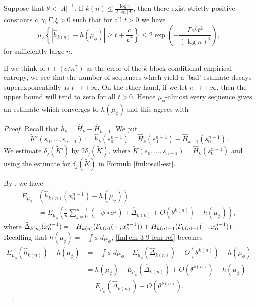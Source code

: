 \begin{theorem} \label{thm:cm-4-2}
	Suppose that $\theta < |A|^{-1}$. If $k(n) \leq \frac{\log{n}}{2\log{|A|}}$, then there exist strictly positive constants $c, \gamma, \Gamma, \xi > 0$ such that for all $t > 0$ we have
	\begin{equation}
		\mu_\phi\left\{\left|\hat{h}_{k(n)} - h(\mu_\phi)\right| \geq t + \frac{c}{n^\gamma}\right\} \leq 2\exp\left(-\frac{\Gamma n^\xi t^2}{(\log{n})^4}\right),
	\end{equation}
	for sufficiently large $n$.
	
	If we think of $t + (c / n^\gamma)$ as the error of the $k$-block conditional empirical entropy, we see that the number of sequences which yield a `bad' estimate decays superexponentially as $t \to +\infty$. On the other hand, if we let $n \to +\infty$, then the upper bound will tend to zero for all $t > 0$. Hence $\mu_\phi$-almost every sequence gives an estimate which converges to $h(\mu_\phi)$ and this agrees with 
	
	\begin{proof}
		Recall that $\hat{h}_k = \hat{H}_k - \hat{H}_{k - 1}$. We put
		\[
			\tilde{K}'(s_0, \dots, s_{n - 1}) := \hat{h}_k(s_0^{n - 1}) = \hat{H}_k(s_0^{n - 1}) - \hat{H}_{k - 1}(s_0^{n - 1}).
		\]
		We estimate $\delta_j(\tilde{K}')$ by $2\delta_j(\tilde{K})$, where $\tilde{K}(s_0, \dots, s_{n - 1}) = \hat{H}_k(s_0^{n - 1})$ and using the estimate for $\delta_j(\tilde{K})$ in Formula \eqref{fml:oscil-est}.
		
		By , we have
		\begin{align}
			E_{\mu_\phi}&\left(\hat{h}_{k(n)}(x_0^{n - 1}) - h(\mu_\phi)\right) \nonumber \\
				&= E_{\mu_\phi}\left(\frac{1}{n}\sum_{j = 0}^{n - 1}(-\phi \circ \sigma^j) + \hat{\Delta}_{k(n)} + O(\theta^{k(n)}) - h(\mu_\phi)\right), \label{fml:cm-3-9-lem-ref}
		\end{align}
		where $\hat{\Delta}_{k(n)}(x_0^{n - 1}) = -H_{k(n)}(\mathcal{E}_{k(n)}(\mathrel{}\cdot\mathrel{}; x_0^{n - 1})) + H_{k(n) - 1}(\mathcal{E}_{k(n) - 1}(\mathrel{}\cdot\mathrel{}; x_0^{n - 1}))$. 
		Recalling that $h(\mu_\phi) = -\int{\phi\ d\mu_\phi}$, \eqref{fml:cm-3-9-lem-ref} becomes
		\begin{align*}
			E_{\mu_\phi}\left(\hat{h}_{k(n)}\right) - h(\mu_\phi) &= -\int{\phi\ d\mu_\phi} + E_{\mu_\phi}\left(\hat{\Delta}_{k(n)}\right) + O(\theta^{k(n)}) - h(\mu_\phi) \\
				&= h(\mu_\phi) + E_{\mu_\phi}\left(\hat{\Delta}_{k(n)}\right) + O(\theta^{k(n)}) - h(\mu_\phi) \\
				&= E_{\mu_\phi}\left(\hat{\Delta}_{k(n)}\right) + O(\theta^{k(n)}).
		\end{align*}
		

\end{proof}
\end{theorem}
